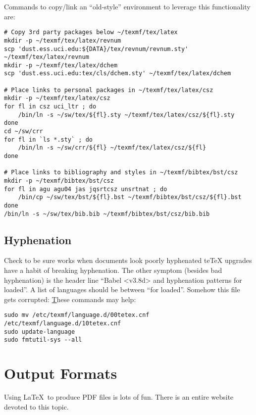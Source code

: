 \documentclass[12pt]{article}
\begin{document}
Commands to copy/link an ``old-style'' environment to leverage this
functionality are: 
\begin{verbatim}
# Copy 3rd party packages below ~/texmf/tex/latex
mkdir -p ~/texmf/tex/latex/revnum
scp 'dust.ess.uci.edu:${DATA}/tex/revnum/revnum.sty' ~/texmf/tex/latex/revnum
mkdir -p ~/texmf/tex/latex/dchem
scp 'dust.ess.uci.edu:tex/cls/dchem.sty' ~/texmf/tex/latex/dchem

# Place links to personal packages in ~/texmf/tex/latex/csz
mkdir -p ~/texmf/tex/latex/csz
for fl in csz uci_ltr ; do
    /bin/ln -s ~/sw/tex/${fl}.sty ~/texmf/tex/latex/csz/${fl}.sty
done
cd ~/sw/crr
for fl in `ls *.sty` ; do
    /bin/ln -s ~/sw/crr/${fl} ~/texmf/tex/latex/csz/${fl}
done

# Place links to bibliography and styles in ~/texmf/bibtex/bst/csz
mkdir -p ~/texmf/bibtex/bst/csz
for fl in agu agu04 jas jqsrtcsz unsrtnat ; do
    /bin/cp ~/sw/tex/bst/${fl}.bst ~/texmf/bibtex/bst/csz/${fl}.bst
done
/bin/ln -s ~/sw/tex/bib.bib ~/texmf/bibtex/bst/csz/bib.bib
\end{verbatim}

\subsection[Hyphenation]{Hyphenation}\label{sxn:hyp}
Check to be sure  works when documents look poorly hyphenated 
 teTeX upgrades have a habit of breaking hyphenation.
The other symptom (besides bad hyphenation) is the header line
``Babel <v3.8d> and hyphenation patterns for loaded''.
A list of languages should be between ``for loaded''.
Somehow this file gets corrupted:
\href{http://www.mail-archive.com/desktop-bugs@lists.ubuntu.com/msg29134.html}
These commands may help:
\begin{verbatim}
sudo mv /etc/texmf/language.d/00tetex.cnf /etc/texmf/language.d/10tetex.cnf
sudo update-language
sudo fmtutil-sys --all
\end{verbatim}

\section[Output Formats]{Output Formats}\label{sxn:out}
Using \LaTeX\ to produce PDF files is lots of fun.
There is an entire  website devoted to this topic.
\end{document}
